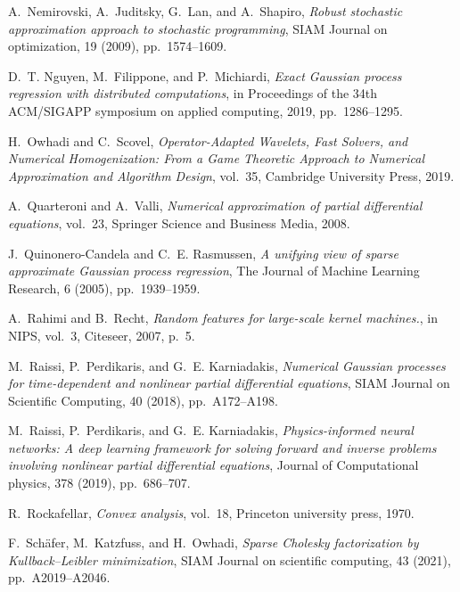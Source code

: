 \documentclass[10pt,reqno]{amsart}
\newcommand{\1}{{\chi}}
\numberwithin{equation}{section}
\theoremstyle{thmlemcorr}
\numberwithin{theorem}{section}
\theoremstyle{thmlemcorr*}
\theoremstyle{defi}
\theoremstyle{remexample}
\theoremstyle{ass}
\begin{document}
\begin{thebibliography}{10}
	{\sc A.~Nemirovski, A.~Juditsky, G.~Lan, and A.~Shapiro}, {\em Robust
		stochastic approximation approach to stochastic programming}, SIAM Journal on
	optimization, 19 (2009), pp.~1574--1609.
	
	{\sc D.~T. Nguyen, M.~Filippone, and P.~Michiardi}, {\em Exact {G}aussian
		process regression with distributed computations}, in Proceedings of the 34th
	ACM/SIGAPP symposium on applied computing, 2019, pp.~1286--1295.
	
	{\sc H.~Owhadi and C.~Scovel}, {\em Operator-Adapted Wavelets, Fast Solvers,
		and Numerical Homogenization: From a Game Theoretic Approach to Numerical
		Approximation and Algorithm Design}, vol.~35, Cambridge University Press,
	2019.
	
	{\sc A.~Quarteroni and A.~Valli}, {\em Numerical approximation of partial
		differential equations}, vol.~23, Springer Science and Business Media, 2008.
	
	{\sc J.~Quinonero-Candela and C.~E. Rasmussen}, {\em A unifying view of sparse
		approximate {G}aussian process regression}, The Journal of Machine Learning
	Research, 6 (2005), pp.~1939--1959.
	
	{\sc A.~Rahimi and B.~Recht}, {\em Random features for large-scale kernel
		machines.}, in NIPS, vol.~3, Citeseer, 2007, p.~5.
	
	{\sc M.~Raissi, P.~Perdikaris, and G.~E. Karniadakis}, {\em Numerical
		{G}aussian processes for time-dependent and nonlinear partial differential
		equations}, SIAM Journal on Scientific Computing, 40 (2018), pp.~A172--A198.
	
	{\sc M.~Raissi, P.~Perdikaris, and G.~E. Karniadakis}, {\em Physics-informed
		neural networks: A deep learning framework for solving forward and inverse
		problems involving nonlinear partial differential equations}, Journal of
	Computational physics, 378 (2019), pp.~686--707.
	
	{\sc R.~Rockafellar}, {\em Convex analysis}, vol.~18, Princeton university
	press, 1970.
	
	{\sc F.~Sch{\"a}fer, M.~Katzfuss, and H.~Owhadi}, {\em Sparse {C}holesky
		factorization by {K}ullback{--}{L}eibler minimization}, SIAM Journal on
	scientific computing, 43 (2021), pp.~A2019--A2046.
	

\end{thebibliography}
\end{document}
